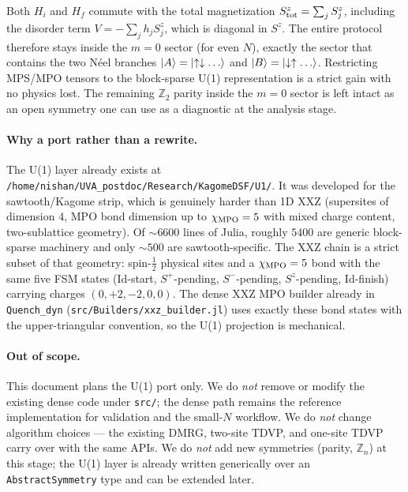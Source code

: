 \documentclass[11pt]{article}
\begin{document}
Both $H_i$ and $H_f$ commute with the total magnetization
$S^z_{\rm tot} = \sum_j S_j^z$, including the disorder term
$V = -\sum_j h_j S_j^z$, which is diagonal in $S^z$.  The entire protocol
therefore stays inside the $m=0$ sector (for even $N$), exactly the sector
that contains the two N\'eel branches $\ket{A}=\ket{\uparrow\downarrow\dots}$
and $\ket{B}=\ket{\downarrow\uparrow\dots}$.  Restricting MPS/MPO tensors to
the block-sparse U(1) representation is a strict gain with no physics lost.
The remaining $\mathbb{Z}_2$ parity inside the $m=0$ sector is left intact as
an open symmetry one can use as a diagnostic at the analysis stage.

\paragraph{Why a port rather than a rewrite.}
The U(1) layer already exists at \texttt{/home/nishan/UVA\_postdoc/Research/KagomeDSF/U1/}.
It was developed for the sawtooth/Kagome strip, which is genuinely harder
than 1D XXZ (supersites of dimension $4$, MPO bond dimension up to $\chi_{\rm MPO}=5$
with mixed charge content, two-sublattice geometry).  Of $\sim 6600$ lines of
Julia, roughly $5400$ are generic block-sparse machinery and only
$\sim 500$ are sawtooth-specific.  The XXZ chain is a strict subset of that
geometry: spin-$\tfrac12$ physical sites and a $\chi_{\rm MPO}=5$ bond with the
same five FSM states (Id-start, $S^+$-pending, $S^-$-pending, $S^z$-pending,
Id-finish) carrying charges $(0,+2,-2,0,0)$.  The dense XXZ MPO builder
already in \texttt{Quench\_dyn} (\texttt{src/Builders/xxz\_builder.jl}) uses
exactly these bond states with the upper-triangular convention, so the U(1)
projection is mechanical.

\paragraph{Out of scope.}
This document plans the U(1) port only.  We do \emph{not} remove or modify
the existing dense code under \texttt{src/}; the dense path remains the
reference implementation for validation and the small-$N$ workflow.  We do
\emph{not} change algorithm choices --- the existing DMRG, two-site TDVP, and
one-site TDVP carry over with the same APIs.  We do \emph{not} add new
symmetries (parity, $\mathbb{Z}_n$) at this stage; the U(1) layer is already
written generically over an \texttt{AbstractSymmetry} type and can be
extended later.

\end{document}
